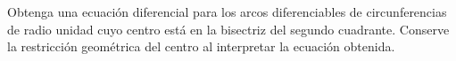 Obtenga una ecuación diferencial para los arcos diferenciables de circunferencias de radio unidad cuyo centro está en la bisectriz del segundo cuadrante. Conserve la restricción geométrica del centro al interpretar la ecuación obtenida.
